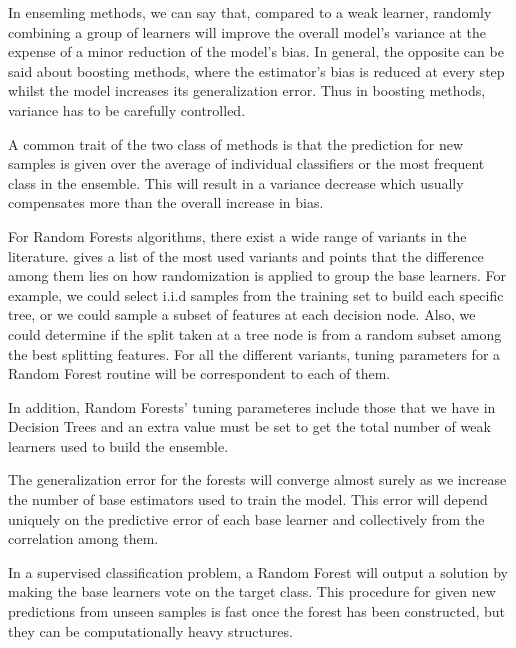 In ensemling methods, we can say that, compared to a weak learner, randomly combining a group of learners will improve the overall model's variance at the expense of a minor reduction of the model's bias. In general, the opposite can be said about boosting methods, where the estimator's bias is reduced at every step whilst the model increases its generalization error. Thus in boosting methods, variance has to be carefully controlled. 

A common trait of the two class of methods is that the prediction for new samples is given over the average of individual classifiers or the most frequent class in the ensemble.  This will result in a variance decrease which usually compensates more than the overall increase in bias.


For Random Forests algorithms, there exist a wide range of variants in the literature.  \cite{breiman-randomforests}  gives a list of the most used variants and points that the difference among them lies on how randomization is applied to group the base learners.  For example, we could select i.i.d samples from the training set to build each specific tree, or we could sample a subset of features at each decision node. Also, we could determine if the split taken at a tree node is from a random subset among the best splitting features. For all the different variants, tuning parameters for a Random Forest routine will be correspondent to each of them.

In addition, Random Forests' tuning parameteres include those that we have in Decision Trees and an extra value must be set to get the total number of weak learners used to build the ensemble. 


The generalization error for the forests will converge almost surely as we increase the number of base estimators used to train the model. This error will depend uniquely on the predictive error of each base learner and collectively from the correlation among them.

In a supervised classification problem, a Random Forest will output a solution by making the base learners vote on the  target class. This procedure for given new predictions from unseen samples is fast once the forest has been constructed, but they can be computationally heavy structures.


\textit{}